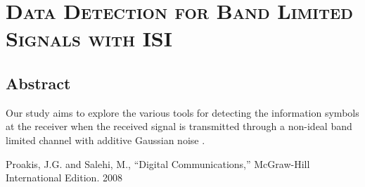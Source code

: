 \documentclass[10pt]{article}
\begin{document}
\section*{\centering \LARGE \textsc{Data Detection for Band Limited Signals with ISI}}

\subsection*{Abstract}
Our study aims to explore the various tools for detecting the information symbols at the receiver when the received signal is transmitted through a non-ideal band limited channel with additive Gaussian noise \cite{Proakis}.

\begin{thebibliography}{10}
Proakis, J.G. and Salehi, M., ``Digital Communications,'' McGraw-Hill International Edition. 2008
\end{thebibliography}
\end{document}
